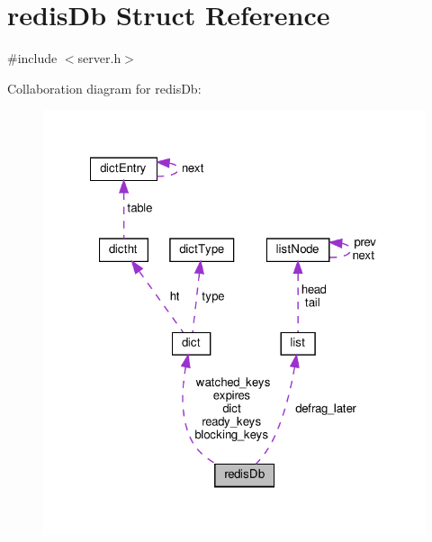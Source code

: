 \hypertarget{structredis_db}{}\section{redis\+Db Struct Reference}
\label{structredis_db}


{\ttfamily \#include $<$server.\+h$>$}



Collaboration diagram for redis\+Db\+:
\nopagebreak
\begin{figure}[H]
\begin{center}
\leavevmode
\includegraphics[width=322pt]{structredis_db__coll__graph}
\end{center}
\end{figure}
